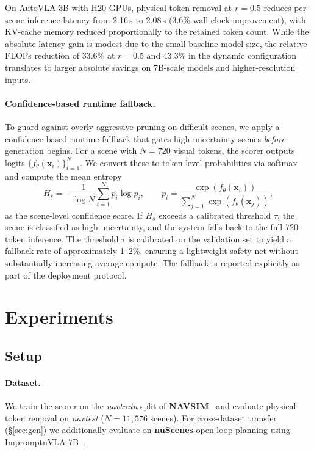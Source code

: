 \documentclass[letterpaper]{article} %
\begin{document}
On AutoVLA-3B with H20 GPUs, physical token removal at $r{=}0.5$ reduces
per-scene inference latency from 2.16\,s to 2.08\,s (3.6\% wall-clock
improvement), with KV-cache memory reduced proportionally to the retained token
count. While the absolute latency gain is modest due to the small baseline model
size, the relative FLOPs reduction of 33.6\% at $r{=}0.5$ and 43.3\% in the
dynamic configuration translates to larger absolute savings on 7B-scale models
and higher-resolution inputs.

\paragraph{Confidence-based runtime fallback.}
To guard against overly aggressive pruning on difficult scenes, we apply a
confidence-based runtime fallback that gates high-uncertainty scenes
\emph{before} generation begins. For a scene with $N{=}720$ visual tokens, the
scorer outputs logits $\{f_\theta(\mathbf{x}_i)\}_{i=1}^{N}$. We convert these
to token-level probabilities via softmax and compute the mean entropy
\begin{equation}
H_s = -\frac{1}{\log N}\sum_{i=1}^{N} p_i\log p_i,\qquad
p_i = \frac{\exp(f_\theta(\mathbf{x}_i))}{\sum_{j=1}^{N}\exp(f_\theta(\mathbf{x}_j))},
\end{equation}
as the scene-level confidence score. If $H_s$ exceeds a calibrated threshold
$\tau$, the scene is classified as high-uncertainty, and the system falls back
to the full 720-token inference. The threshold $\tau$ is calibrated on the
validation set to yield a fallback rate of approximately 1--2\%, ensuring a
lightweight safety net without substantially increasing average compute. The
fallback is reported explicitly as part of the deployment protocol.
\section{Experiments}
\label{sec:exp}

\subsection{Setup}
\label{sec:setup}

\paragraph{Dataset.}
We train the scorer on the \emph{navtrain} split of \textbf{NAVSIM}~\citep{navsim2024}
and evaluate physical token removal on \emph{navtest} ($N{=}11{,}576$ scenes).
For cross-dataset transfer (\S\ref{sec:gen}) we additionally evaluate on
\textbf{nuScenes} open-loop planning using ImpromptuVLA-7B~\citep{impromptuvla2025}.
\end{document}
